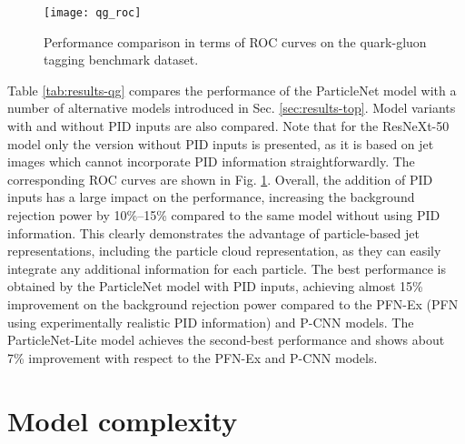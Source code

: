 \documentclass[aps,prd,longbibliography,reprint,amsmath,amssymb,amsfonts]{revtex4-1}
\begin{document}
\begin{figure}[htbp]
    \centering
    \texttt{[image: qg\_roc]}
    \caption{Performance comparison in terms of ROC curves on the quark-gluon tagging benchmark dataset.}
    \label{fig:roc-qg}
\end{figure}

Table \ref{tab:results-qg} compares the performance of the ParticleNet model with a number of alternative models introduced in Sec. \ref{sec:results-top}. Model variants with and without PID inputs are also compared. Note that for the ResNeXt-50 model only the version without PID inputs is presented, as it is based on jet images which cannot incorporate PID information straightforwardly. The corresponding ROC curves are shown in Fig. \ref{fig:roc-qg}. Overall, the addition of PID inputs has a large impact on the performance, increasing the background rejection power by 10\%--15\% compared to the same model without using PID information. This clearly demonstrates the advantage of particle-based jet representations, including the particle cloud representation, as they can easily integrate any additional information for each particle. The best performance is obtained by the ParticleNet model with PID inputs, achieving almost 15\% improvement on the background rejection power compared to the PFN-Ex (PFN using experimentally realistic PID information) and P-CNN models. The ParticleNet-Lite model achieves the second-best performance and shows about 7\% improvement with respect to the PFN-Ex and P-CNN models.


\section{Model complexity}
\label{sec:model-complexity}
\end{document}
